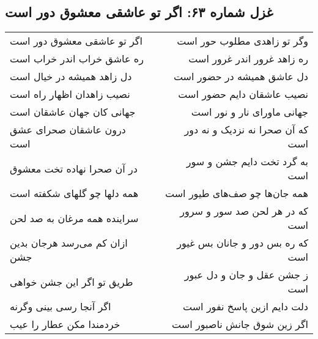 \begin{center}
\section*{غزل شماره ۶۳: اگر تو عاشقی معشوق دور است}
\label{sec:063}
\begin{longtable}{l p{0.5cm} r}
اگر تو عاشقی معشوق دور است
&&
وگر تو زاهدی مطلوب حور است
\\
ره عاشق خراب اندر خراب است
&&
ره زاهد غرور اندر غرور است
\\
دل زاهد همیشه در خیال است
&&
دل عاشق همیشه در حضور است
\\
نصیب زاهدان اظهار راه است
&&
نصیب عاشقان دایم حضور است
\\
جهانی کان جهان عاشقان است
&&
جهانی ماورای نار و نور است
\\
درون عاشقان صحرای عشق است
&&
که آن صحرا نه نزدیک و نه دور است
\\
در آن صحرا نهاده تخت معشوق
&&
به گرد تخت دایم جشن و سور است
\\
همه دلها چو گلهای شکفته است
&&
همه جان‌ها چو صف‌های طیور است
\\
سراینده همه مرغان به صد لحن
&&
که در هر لحن صد سور و سرور است
\\
ازان کم می‌رسد هرجان بدین جشن
&&
که ره بس دور و جانان بس غیور است
\\
طریق تو اگر این جشن خواهی
&&
ز جشن عقل و جان و دل عبور است
\\
اگر آنجا رسی بینی وگرنه
&&
دلت دایم ازین پاسخ نفور است
\\
خردمندا مکن عطار را عیب
&&
اگر زین شوق جانش ناصبور است
\\
\end{longtable}
\end{center}
